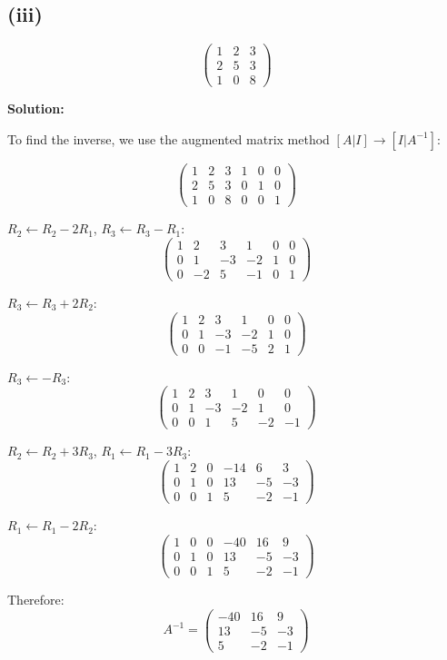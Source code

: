 \subsection*{(iii)}
\[
	\begin{pmatrix}
		1 & 2 & 3 \\
		2 & 5 & 3 \\
		1 & 0 & 8
	\end{pmatrix}
\]

\textbf{Solution:}

To find the inverse, we use the augmented matrix method $[A|I] \rightarrow [I|A^{-1}]$:

\[
	\left(\begin{array}{ccc|ccc}
			1 & 2 & 3 & 1 & 0 & 0 \\
			2 & 5 & 3 & 0 & 1 & 0 \\
			1 & 0 & 8 & 0 & 0 & 1
		\end{array}\right)
\]

$R_2 \leftarrow R_2 - 2R_1$, $R_3 \leftarrow R_3 - R_1$:
\[
	\left(\begin{array}{ccc|ccc}
			1 & 2  & 3  & 1  & 0 & 0 \\
			0 & 1  & -3 & -2 & 1 & 0 \\
			0 & -2 & 5  & -1 & 0 & 1
		\end{array}\right)
\]

$R_3 \leftarrow R_3 + 2R_2$:
\[
	\left(\begin{array}{ccc|ccc}
			1 & 2 & 3  & 1  & 0 & 0 \\
			0 & 1 & -3 & -2 & 1 & 0 \\
			0 & 0 & -1 & -5 & 2 & 1
		\end{array}\right)
\]

$R_3 \leftarrow -R_3$:
\[
	\left(\begin{array}{ccc|ccc}
			1 & 2 & 3  & 1  & 0  & 0  \\
			0 & 1 & -3 & -2 & 1  & 0  \\
			0 & 0 & 1  & 5  & -2 & -1
		\end{array}\right)
\]

$R_2 \leftarrow R_2 + 3R_3$, $R_1 \leftarrow R_1 - 3R_3$:
\[
	\left(\begin{array}{ccc|ccc}
			1 & 2 & 0 & -14 & 6  & 3  \\
			0 & 1 & 0 & 13  & -5 & -3 \\
			0 & 0 & 1 & 5   & -2 & -1
		\end{array}\right)
\]

$R_1 \leftarrow R_1 - 2R_2$:
\[
	\left(\begin{array}{ccc|ccc}
			1 & 0 & 0 & -40 & 16 & 9  \\
			0 & 1 & 0 & 13  & -5 & -3 \\
			0 & 0 & 1 & 5   & -2 & -1
		\end{array}\right)
\]

Therefore:
\[
	A^{-1} = \begin{pmatrix}
		-40 & 16 & 9  \\
		13  & -5 & -3 \\
		5   & -2 & -1
	\end{pmatrix}
\]